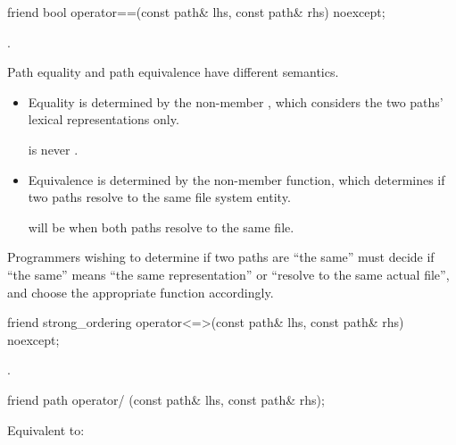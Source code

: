 %
\begin{itemdecl}
friend bool operator==(const path& lhs, const path& rhs) noexcept;
\end{itemdecl}

\begin{itemdescr}
\pnum
\returns
{}.

\pnum
\begin{note}
Path equality and path equivalence have different semantics.
\begin{itemize}
\item Equality is determined by the  non-member ,
which considers the two paths' lexical representations only.
\begin{example}
 is never .
\end{example}
\item Equivalence is determined by the  non-member function, which
determines if two paths resolve to the same file system entity.
\begin{example}
 will be  when both paths resolve to the same file.
\end{example}
\end{itemize}
Programmers wishing to determine if two paths are ``the same'' must decide if
  ``the same'' means ``the same representation'' or ``resolve to the same actual
  file'', and choose the appropriate function accordingly.
\end{note}
\end{itemdescr}

%
\begin{itemdecl}
friend strong_ordering operator<=>(const path& lhs, const path& rhs) noexcept;
\end{itemdecl}

\begin{itemdescr}
\pnum
\returns
{}.
\end{itemdescr}

%
\begin{itemdecl}
friend path operator/ (const path& lhs, const path& rhs);
\end{itemdecl}

\begin{itemdescr}
\pnum
\effects
Equivalent to: 
\end{itemdescr}

